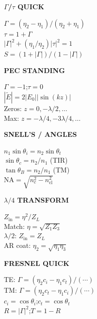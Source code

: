 \documentclass[6pt,letterpaper]{article}
\newcommand{\shead}[3]{%
  \noindent\colorbox{#1}{\parbox{\dimexpr\linewidth-2\fboxsep\relax}%
  {\color{#2}\bfseries\fontsize{6}{7}\selectfont #3}}\vspace{0.5pt}}
\begin{document}
\vfill
\noindent
\begin{minipage}[t]{0.19\linewidth}
\shead{coralbg}{coral}{$\Gamma$/$\tau$ QUICK}
\begin{ebox}
$\Gamma=(\eta_2-\eta_1)/(\eta_2+\eta_1)$\\
$\tau=1+\Gamma$\\
$|\Gamma|^2+(\eta_1/\eta_2)|\tau|^2=1$\\
$S=(1+|\Gamma|)/(1-|\Gamma|)$
\end{ebox}
\end{minipage}\hfill
\begin{minipage}[t]{0.19\linewidth}
\shead{coralbg}{coral}{PEC STANDING}
\begin{ebox}
$\Gamma=-1$;\;$\tau=0$\\
$|\tilde{E}|=2|E_0||\sin(kz)|$\\
Zeros: $z=0,-\lambda/2,\ldots$\\
Max: $z=-\lambda/4,-3\lambda/4,\ldots$
\end{ebox}
\end{minipage}\hfill
\begin{minipage}[t]{0.19\linewidth}
\shead{bluebg}{blue}{SNELL'S / ANGLES}
\begin{ebox}
$n_1\sin\theta_i=n_2\sin\theta_t$\\
$\sin\theta_c=n_2/n_1$ (TIR)\\
$\tan\theta_B=n_2/n_1$ (TM)\\
$\text{NA}=\sqrt{n_c^2-n_\text{cl}^2}$
\end{ebox}
\end{minipage}\hfill
\begin{minipage}[t]{0.19\linewidth}
\shead{purplebg}{purple}{$\lambda/4$ TRANSFORM}
\begin{ebox}
$Z_\text{in}=\eta^2/Z_L$\\
Match: $\eta=\sqrt{Z_1 Z_3}$\\
$\lambda/2$: $Z_\text{in}=Z_L$\\
AR coat: $\eta_2=\sqrt{\eta_1\eta_3}$
\end{ebox}
\end{minipage}\hfill
\begin{minipage}[t]{0.19\linewidth}
\shead{bluebg}{blue}{FRESNEL QUICK}
\begin{ebox}
TE: $\Gamma=(\eta_2c_i-\eta_1c_t)/(\cdots)$\\
TM: $\Gamma=(\eta_2c_t-\eta_1c_i)/(\cdots)$\\
$c_i=\cos\theta_i$;\;$c_t=\cos\theta_t$\\
$R=|\Gamma|^2$;\;$T=1-R$
\end{ebox}
\end{minipage}
\end{document}
